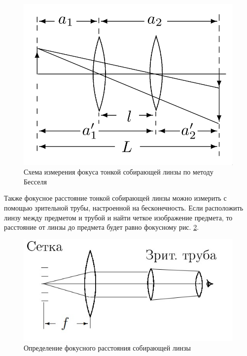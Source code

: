 \documentclass[
a4paper, %
12pt, %
]{article}
\begin{document}
	\begin{figure}[h!]
		\centering
		\includegraphics[scale=0.3]{measurement_collecting_lens.png}
		\caption{Схема измерения фокуса тонкой собирающей линзы по методу Бесселя}
		\label{Bessel scheme}
	\end{figure}
		

	Также фокусное расстояние тонкой собирающей линзы можно измерить с помощью зрительной трубы, настроенной на бесконечность. Если расположить линзу между предметом и трубой и найти четкое изображение предмета, то расстояние от линзы до предмета будет равно фокусному рис. \ref{Tube_collective}.
	
	\begin{figure}[h!]
		\centering
		\includegraphics[scale=0.8]{tube_collective.jpg}
		\caption{Определение фокусного расстояния собирающей линзы}
		\label{Tube_collective}
	\end{figure}
	
	\newpage
\end{document}

